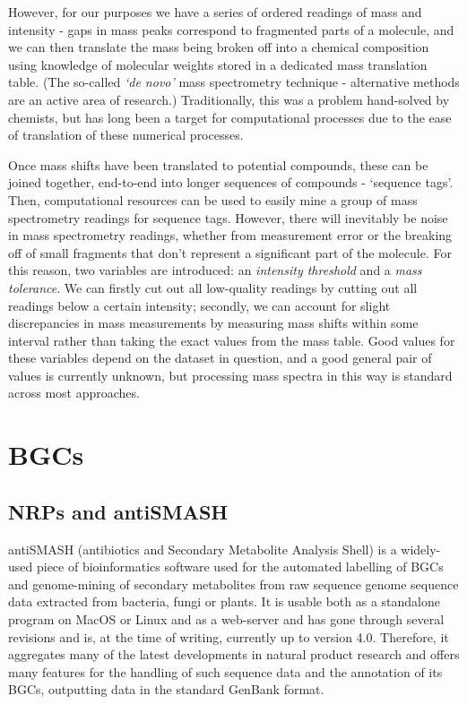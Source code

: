 \documentclass{l4proj}
\newcommand{\cit}[1]{\citep{#1}}
\begin{document}
However, for our purposes we have a series of ordered readings of mass and intensity - gaps in mass peaks correspond to fragmented parts of a molecule, and we can then translate the mass being broken off into a chemical composition using knowledge of molecular weights stored in a dedicated mass translation table. (The so-called \textit{`de novo'} mass spectrometry technique - alternative methods are an active area of research.) Traditionally, this was a problem hand-solved by chemists, but has long been a target for computational processes due to the ease of translation of these numerical processes. 

Once mass shifts have been translated to potential compounds, these can be joined together, end-to-end into longer sequences of compounds - `sequence tags'. Then, computational resources can be used to easily mine a group of mass spectrometry readings for sequence tags. However, there will inevitably be noise in mass spectrometry readings, whether from measurement error or the breaking off of small fragments that don't represent a significant part of the molecule. For this reason, two variables are introduced: an \textit{intensity threshold} and a \textit{mass tolerance}. We can firstly cut out all low-quality readings by cutting out all readings below a certain intensity; secondly, we can account for slight discrepancies in mass measurements by measuring mass shifts within some interval rather than taking the exact values from the mass table. Good values for these variables depend on the dataset in question, and a good general pair of values is currently unknown, but processing mass spectra in this way is standard across most approaches.

\section{BGCs}

\subsection{NRPs and antiSMASH}

antiSMASH (antibiotics and Secondary Metabolite Analysis Shell) \cit{as4} is a widely-used piece of bioinformatics software used for the automated labelling of BGCs and genome-mining of secondary metabolites from raw sequence genome sequence data extracted from bacteria, fungi or plants. It is usable both as a standalone program on MacOS or Linux and as a web-server and has gone through several revisions and is, at the time of writing, currently up to version 4.0. Therefore, it aggregates many of the latest developments in natural product research and offers many features for the handling of such sequence data and the annotation of its BGCs, outputting data in the standard GenBank format.
\end{document}
